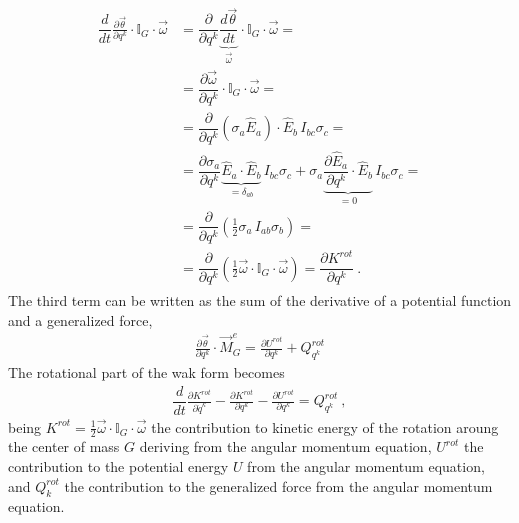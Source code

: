 \documentclass[letterpaper,10pt,english]{jupyterBook}
\begin{document}
\begin{equation*}
\begin{split}\begin{aligned}
 \dfrac{d}{dt} \frac{\partial \vec{\theta}}{\partial q^k} \cdot \mathbb{I}_G \cdot \vec{\omega} 
  & = \dfrac{\partial }{\partial q^k} \underbrace{\dfrac{d \vec{\theta}}{d t}}_{\vec{\omega}} \cdot \mathbb{I}_G \cdot \vec{\omega} = \\
  & = \dfrac{\partial \vec{\omega}}{\partial q^k} \cdot \mathbb{I}_G \cdot \vec{\omega} = \\
  & = \dfrac{\partial}{\partial q^k} \left( \sigma_a \hat{E}_a \right) \cdot \hat{E}_b \, I_{bc} \sigma_c = \\
  & = \dfrac{\partial \sigma_a}{\partial q^k} \underbrace{\hat{E}_a \cdot \hat{E}_b}_{= \delta_{ab}} \, I_{bc} \sigma_c 
    + \sigma_a \underbrace{\dfrac{\partial \hat{E}_a}{\partial q^k}  \cdot \hat{E}_b}_{= 0} \, I_{bc} \sigma_c = \\
  & = \dfrac{\partial}{\partial q^k} \left( \frac{1}{2} \sigma_a \, I_{ab} \sigma_b \right) = \\
  & = \dfrac{\partial }{\partial q^k} \left( \frac{1}{2} \vec{\omega} \cdot \mathbb{I}_G \cdot \vec{\omega} \right) 
    = \dfrac{\partial K^{rot}}{\partial q^k} \ .
\end{aligned}\end{split}
\end{equation*}
\sphinxAtStartPar
The third term can be written as the sum of the derivative of a potential function and a generalized force,
\begin{equation*}
\begin{split}\frac{\partial \vec{\theta}}{\partial q^k} \cdot \vec{M}_G^e = \frac{\partial U^{rot}}{\partial q^k} + Q^{rot}_{q^k}\end{split}
\end{equation*}
\sphinxAtStartPar
The rotational part of the wak form becomes
\begin{equation*}
\begin{split}\dfrac{d}{dt}\frac{\partial K^{rot}}{\partial \dot{q}^k} - \frac{\partial K^{rot}}{\partial q^k} - \frac{\partial U^{rot}}{\partial q^{k}} = Q^{rot}_{q^k} \ ,\end{split}
\end{equation*}
\sphinxAtStartPar
being \(K^{rot} = \frac{1}{2} \vec{\omega} \cdot \mathbb{I}_G \cdot \vec{\omega}\) the contribution to kinetic energy of the rotation aroung the center of mass \(G\) deriving from the angular momentum equation, \(U^{rot}\) the contribution to the potential energy \(U\) from the angular momentum equation, and \(Q^{rot}_{k}\) the contribution to the generalized force from the angular momentum equation.
\end{document}
